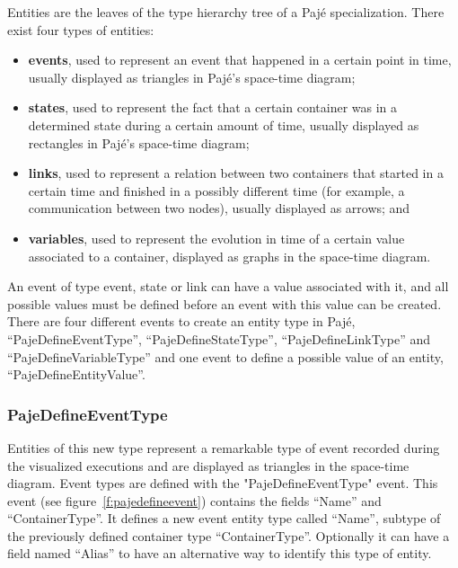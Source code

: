 Entities are the leaves of the type hierarchy tree of a Pajé
specialization. There exist four types of entities:
\begin{itemize}
\item \textbf{events}, used to represent an event that happened in a
certain point in time, usually displayed as triangles in Pajé's space-time
diagram;
\item \textbf{states}, used to represent the fact that a certain
container was in a determined state during a certain amount of time, usually
displayed as rectangles in Pajé's space-time diagram;
\item \textbf{links}, used to represent a relation between two
containers that started in a certain time and finished in a possibly different
time (for example, a communication between two nodes), usually displayed as arrows; and
\item \textbf{variables}, used to represent the evolution in
time of a
certain value associated to a container, displayed as
graphs in the space-time diagram.
\end{itemize}

An event of type event, state or link can have a value associated with it, and
all possible values must be defined before an event with this value can be
created.
There are four different events to create an entity type in Pajé,
``PajeDefineEventType'', ``PajeDefineStateType'', ``PajeDefineLinkType'' and
``PajeDefineVariableType'' and one event to define a possible value of an
entity, ``PajeDefineEntityValue''.

\subsubsection*{PajeDefineEventType}

Entities of this new type represent a remarkable type of event
recorded during the visualized executions and are displayed as
triangles in the space-time diagram.  Event types are defined with the
"PajeDefineEventType" event.
This event (see figure~\ref{f:pajedefineevent}) contains the
fields ``Name'' and ``ContainerType''.  It defines a
new event entity type called ``Name'', subtype of the previously defined
container type ``ContainerType''. Optionally it can have a field named ``Alias''
to have an alternative way to identify this type of entity.

